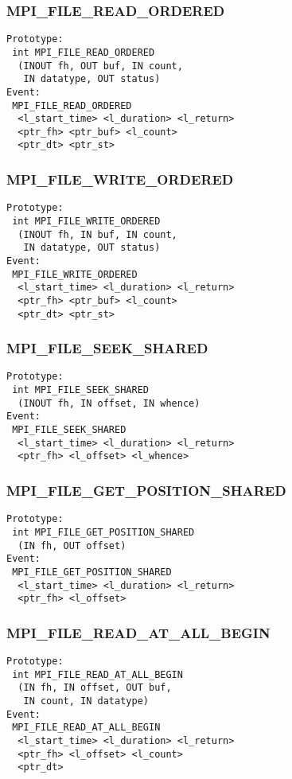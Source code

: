 \documentclass{article}
\begin{document}
\subsubsection{MPI\_FILE\_READ\_ORDERED}
\label{sec:MPIFILEREADORDERED}
\begin{verbatim}
Prototype:
 int MPI_FILE_READ_ORDERED
  (INOUT fh, OUT buf, IN count, 
   IN datatype, OUT status)
Event:
 MPI_FILE_READ_ORDERED 
  <l_start_time> <l_duration> <l_return>
  <ptr_fh> <ptr_buf> <l_count>
  <ptr_dt> <ptr_st>
\end{verbatim}

\subsubsection{MPI\_FILE\_WRITE\_ORDERED}
\label{sec:MPIFILEWRITEORDERED}
\begin{verbatim}
Prototype:
 int MPI_FILE_WRITE_ORDERED
  (INOUT fh, IN buf, IN count, 
   IN datatype, OUT status)
Event:
 MPI_FILE_WRITE_ORDERED 
  <l_start_time> <l_duration> <l_return>
  <ptr_fh> <ptr_buf> <l_count>
  <ptr_dt> <ptr_st>
\end{verbatim}

\subsubsection{MPI\_FILE\_SEEK\_SHARED}
\label{sec:MPIFILESEEKSHARED}
\begin{verbatim}
Prototype:
 int MPI_FILE_SEEK_SHARED
  (INOUT fh, IN offset, IN whence)
Event:
 MPI_FILE_SEEK_SHARED 
  <l_start_time> <l_duration> <l_return>
  <ptr_fh> <l_offset> <l_whence>
\end{verbatim}

\subsubsection{MPI\_FILE\_GET\_POSITION\_SHARED}
\label{sec:MPIFILEGETPOSITIONSHARED}
\begin{verbatim}
Prototype:
 int MPI_FILE_GET_POSITION_SHARED
  (IN fh, OUT offset)
Event:
 MPI_FILE_GET_POSITION_SHARED 
  <l_start_time> <l_duration> <l_return>
  <ptr_fh> <l_offset>
\end{verbatim}

\subsubsection{MPI\_FILE\_READ\_AT\_ALL\_BEGIN}
\label{sec:MPIFILEREADATALLBEGIN}
\begin{verbatim}
Prototype:
 int MPI_FILE_READ_AT_ALL_BEGIN
  (IN fh, IN offset, OUT buf, 
   IN count, IN datatype)
Event:
 MPI_FILE_READ_AT_ALL_BEGIN 
  <l_start_time> <l_duration> <l_return>
  <ptr_fh> <l_offset> <l_count>
  <ptr_dt>
\end{verbatim}
\end{document}
